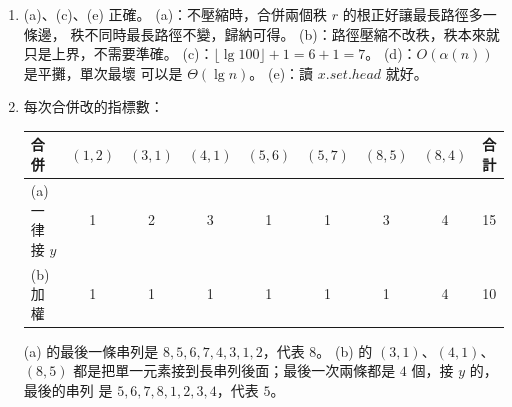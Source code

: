 \begin{enumerate}
\item (a)、(c)、(e) 正確。 (a)：不壓縮時，合併兩個秩 $r$ 的根正好讓最長路徑多一條邊，
秩不同時最長路徑不變，歸納可得。 (b)：路徑壓縮不改秩，秩本來就只是上界，不需要準確。
(c)：$\lfloor \lg 100 \rfloor + 1 = 6 + 1 = 7$。 (d)：$O(\alpha(n))$ 是平攤，單次最壞
可以是 $\Theta(\lg n)$。 (e)：讀 $x.\mathit{set}.\mathit{head}$ 就好。

\item 每次合併改的指標數：
\begin{center}
\begin{tabular}{lccccccc|c}
\toprule
合併 & $(1,2)$ & $(3,1)$ & $(4,1)$ & $(5,6)$ & $(5,7)$ & $(8,5)$ & $(8,4)$ & 合計 \\
\midrule
(a) 一律接 $y$ & 1 & 2 & 3 & 1 & 1 & 3 & 4 & 15 \\
(b) 加權 & 1 & 1 & 1 & 1 & 1 & 1 & 4 & 10 \\
\bottomrule
\end{tabular}
\end{center}
(a) 的最後一條串列是 $8, 5, 6, 7, 4, 3, 1, 2$，代表 $8$。 (b) 的 $(3, 1)$、$(4, 1)$、
$(8, 5)$ 都是把單一元素接到長串列後面；最後一次兩條都是 $4$ 個，接 $y$ 的，最後的串列
是 $5, 6, 7, 8, 1, 2, 3, 4$，代表 $5$。


\end{enumerate}
